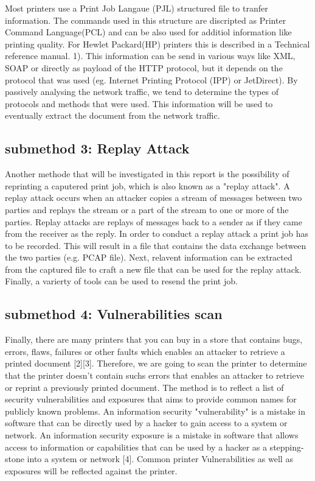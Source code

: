\documentclass[a4paper]{article}
\begin{document}
Most printers use a Print Job Langaue (PJL) structured file to tranfer information. The commands used in this structure are discripted as Printer Command Language(PCL) and can be also used for additiol information like printing quality. For Hewlet Packard(HP) printers this is described in a Technical reference manual. 1). This information can be send in various ways like XML, SOAP or directly as payload of the HTTP protocol, but it depends  on the protocol that was used (eg. Internet Printing Protocol (IPP) or JetDirect). By passively analysing the network traffic, we tend to determine the types of protocols and methods that were used. This information will be used to eventually extract the document from the network traffic.

\subsection{submethod 3:  Replay Attack}
Another methode that will be investigated in this report is the
possibility of reprinting a caputered print job, which is also known as a
"replay attack". A replay attack occurs when an attacker copies a stream of messages between two parties and replays the stream or a part of the stream to one or more of the parties. Replay attacks are replays of messages back to a sender as if they came from the receiver as the reply. In order to conduct a replay attack a print job has to be recorded. This will result in a file that contains the data exchange between the two parties (e.g. PCAP file). Next, relavent information can be extracted from the captured file to craft a new file that can be used for the replay attack. Finally, a varierty of tools can be used to resend the print job.

\subsection{submethod 4:  Vulnerabilities scan}
Finally, there are many printers that you can buy in a store that contains
bugs, errors, flaws, failures or other faults which enables an attacker to
retrieve a printed document [2][3]. Therefore, we are going to scan the
printer to determine that the printer doesn't contain suchs errors that enables an attacker to retrieve or reprint a previously printed document. The method is to reflect a list of security vulnerabilities and exposures that aims to provide common names for publicly known problems. An information security "vulnerability" is a mistake in software that can be directly used by a hacker to gain access to a system or network. An information security exposure is a mistake in software that allows access to information or capabilities that can be used by a hacker as a stepping-stone into a system or network [4]. Common printer
Vulnerabilities as well as exposures will be reflected against the printer.
\end{document}
